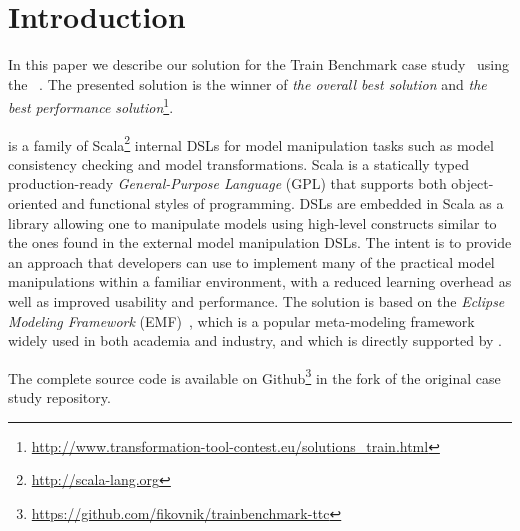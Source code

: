 

\section{Introduction}
\label{sec:Introduction}

In this paper we describe our solution for the \TTC Train Benchmark case study~\cite{Szarnyas2015} using the \SIGMA~\cite{Krikava2014}.
The presented solution is the winner of \emph{the overall best solution} and \emph{the best performance solution}\footnote{\url{http://www.transformation-tool-contest.eu/solutions_train.html}}.

\SIGMA is a family of Scala\footnote{\url{http://scala-lang.org}} internal DSLs for model manipulation tasks such as model consistency checking and model transformations.
Scala is a statically typed production-ready \emph{General-Purpose Language} (GPL) that supports both object-oriented and functional styles of programming.
%
\SIGMA DSLs are embedded in Scala as a library allowing one to manipulate models using high-level constructs similar to the ones found in the external model manipulation DSLs.
The intent is to provide an approach that developers can use to implement many of the practical model manipulations within a familiar environment, with a reduced learning overhead as well as improved usability and performance.
The solution is based on the \emph{Eclipse Modeling Framework} (EMF)~\cite{EMF}, which is a popular meta-modeling framework widely used in both academia and industry, and which is directly supported by \SIGMA.

The complete source code is available on Github\footnote{\url{https://github.com/fikovnik/trainbenchmark-ttc}} in the fork of the original case study repository.
